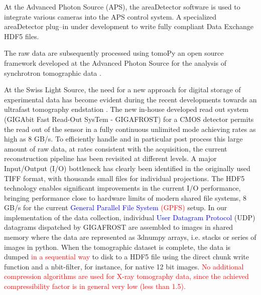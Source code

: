 \documentclass[pdf]{iucr}              %
\begin{document}
At the Advanced Photon Source (APS), the areaDetector software \cite{area_detector} is used to integrate various cameras into the APS control system. A specialized areaDetector plug--in under development to write fully compliant Data Exchange HDF5 files. 

The raw data are subsequently processed using tomoPy an open source framework developed at the Advanced Photon Source for the analysis of synchrotron tomographic data \cite{python_cpp}.

At the Swiss Light Source, the need for a new approach for digital storage of experimental data has become evident during the recent developments towards an ultrafast tomography endstation \cite{mokso2010}. The new in-house developed read out system (GIGAbit Fast Read-Out SysTem - GIGAFROST) for a CMOS detector permits the read out of the sensor in a fully continuous unlimited mode achieving rates as high as 8 GB/s. To efficiently handle and in particular post process this large amount of raw data, at rates consistent with the acquisition, the current reconstruction pipeline has been revisited at different levels. A major Input/Output (I/O) bottleneck has clearly been identified in the originally used TIFF format, with thousands small files for individual projections. The HDF5 technology enables significant improvements in the current I/O performance, bringing performance close to hardware limits of modern shared file systems, 8 GB/s for the current \textcolor{blue}{General Parallel File System }\textcolor{red}{(GPFS)} setup. In our implementation of the data collection, individual \textcolor{blue}{User Datagram Protocol} (UDP) datagrams dispatched by GIGAFROST are assembled to images in shared memory where the data are represented as 3dnumpy arrays, i.e. stacks or series of images in python. When the tomographic dataset is complete, the data is dumped \textcolor{red}{in a sequential way} to disk to a HDF5 file using the direct chunk write function \cite{donath2013} and a nbit-filter, for instance, for native 12 bit images. \textcolor{red}{ No additional compression algorithms are used for X-ray tomography data, since the achieved compressibility factor is in general very low (less than 1.5).}
\end{document}
